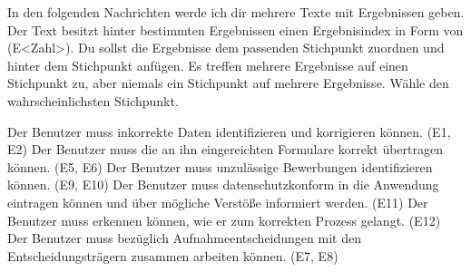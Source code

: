 In den folgenden Nachrichten werde ich dir mehrere Texte mit Ergebnissen geben.
Der Text besitzt hinter bestimmten Ergebnissen einen Ergebnisindex in Form von (E<Zahl>).
Du sollst die Ergebnisse dem passenden Stichpunkt zuordnen und hinter dem Stichpunkt anfügen.
Es treffen mehrere Ergebnisse auf einen Stichpunkt zu, aber niemals ein Stichpunkt auf mehrere Ergebnisse.
Wähle den wahrscheinlichsten Stichpunkt.




Der Benutzer muss inkorrekte Daten identifizieren und korrigieren können. (E1, E2)
Der Benutzer muss die an ihn eingereichten Formulare korrekt übertragen können. (E5, E6)
Der Benutzer muss unzulässige Bewerbungen identifizieren können. (E9, E10)
Der Benutzer muss datenschutzkonform in die Anwendung eintragen können und über mögliche Verstöße informiert werden. (E11)
Der Benutzer muss erkennen können, wie er zum korrekten Prozess gelangt. (E12)
Der Benutzer muss bezüglich Aufnahmeentscheidungen mit den Entscheidungsträgern zusammen arbeiten können. (E7, E8)